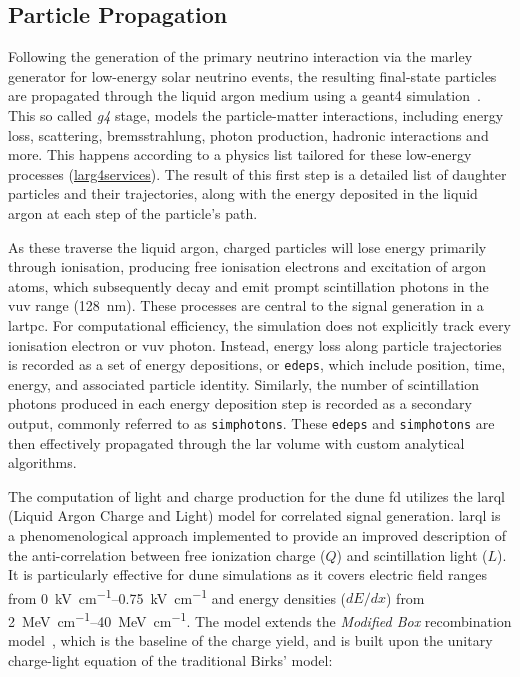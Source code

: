 \subsection{Particle Propagation}
Following the generation of the primary neutrino interaction via the \gls{marley} generator for low-energy solar neutrino events, the resulting final-state particles are propagated through the liquid argon medium using a \gls{geant4} simulation~\cite{GEANT4_2003}. This so called \emph{g4} stage, models the particle-matter interactions, including energy loss, scattering, bremsstrahlung, photon production, hadronic interactions and more. This happens according to a physics list tailored for these low-energy processes (\href{https://github.com/DUNE/dunesim/blob/develop/dunesim/Simulation/larg4services_dune.fcl}{larg4services}). The result of this first step is a detailed list of daughter particles and their trajectories, along with the energy deposited in the liquid argon at each step of the particle's path.

As these traverse the liquid argon, charged particles will lose energy primarily through ionisation, producing free ionisation electrons and excitation of argon atoms, which subsequently decay and emit prompt scintillation photons in the \gls{vuv} range (\SI{128}{\nano\meter}). These processes are central to the signal generation in a \gls{lartpc}. For computational efficiency, the simulation does not explicitly track every ionisation electron or \gls{vuv} photon. Instead, energy loss along particle trajectories is recorded as a set of energy depositions, or \texttt{edeps}, which include position, time, energy, and associated particle identity. Similarly, the number of scintillation photons produced in each energy deposition step is recorded as a secondary output, commonly referred to as \texttt{simphotons}. These \texttt{edeps} and \texttt{simphotons} are then effectively propagated through the \gls{lar} volume with custom analytical algorithms.

The computation of light and charge production for the \gls{dune} \gls{fd} utilizes the \gls{larql} (Liquid Argon Charge and Light) model for correlated signal generation. \gls{larql} is a phenomenological approach implemented to provide an improved description of the anti-correlation between free ionization charge ($Q$) and scintillation light ($L$). It is particularly effective for \gls{dune} simulations as it covers electric field ranges from \qtyrange{0}{0.75}{\kilo\volt\per\centi\meter} and energy densities ($dE/dx$) from \qtyrange{2}{40}{\mega\electronvolt\per\centi\meter}. The model extends the \textit{Modified Box} recombination model~\cite{RAcciarri_2013}, which is the baseline of the charge yield, and is built upon the unitary charge-light equation of the traditional Birks' model:

